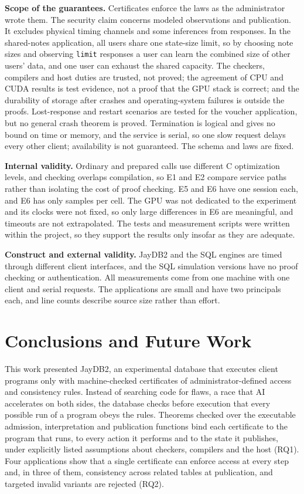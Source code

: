 \documentclass[12pt]{article}
\newcommand{\code}[1]{\texttt{#1}}
\begin{document}
\textbf{Scope of the guarantees.} Certificates enforce the laws as the
administrator wrote them. The security claim concerns modeled observations and
publication. It excludes physical timing channels and some
inferences from responses. In the shared-notes application, all users share one
state-size limit, so by choosing note sizes and observing \code{limit}
responses a user can learn the combined size of other users' data, and one user
can exhaust the shared capacity. The checkers, compilers and host duties are
trusted, not proved; the agreement of CPU and CUDA results is test evidence,
not a proof that the GPU stack is correct; and the durability of storage after
crashes and operating-system failures is outside the proofs. Lost-response and
restart scenarios are tested for the voucher application, but no general crash
theorem is proved. Termination is logical and gives no bound on time or memory, and the service is
serial, so one slow request delays every other client; availability is not
guaranteed. The schema and laws are fixed.

\textbf{Internal validity.} Ordinary and prepared calls use different C
optimization levels, and checking overlaps compilation, so E1 and E2 compare
service paths rather than isolating the cost of proof checking. E5 and E6 have
one session each, and E6 has only \SimulationRepeats{} samples per cell. The GPU
was not dedicated to the experiment and its clocks were not fixed, so only large
differences in E6 are meaningful, and timeouts are not extrapolated. The tests
and measurement scripts were written within the project, so they support the
results only insofar as they are adequate.

\textbf{Construct and external validity.} JayDB2 and the SQL engines are timed
through different client interfaces, and the SQL simulation versions have no
proof checking or authentication. All measurements come from one machine with
one client and serial requests. The applications are small and have two
principals each, and line counts describe source size rather than effort.

\section{Conclusions and Future Work}
\label{sec:conclusion}
This work presented JayDB2, an experimental database that executes client
programs only with machine-checked certificates of administrator-defined access
and consistency rules. Instead of searching code for flaws, a race that AI
accelerates on both sides, the database checks before execution that every
possible run of a program obeys the rules. Theorems checked over the executable admission,
interpretation and publication functions bind each certificate to the program
that runs, to every action it performs and to the state it publishes, under
explicitly listed assumptions about checkers, compilers and the host (RQ1).
Four applications show that a single certificate can enforce access at every
step and, in three of them, consistency across related tables at publication, and
targeted invalid variants are rejected (RQ2).
\end{document}
